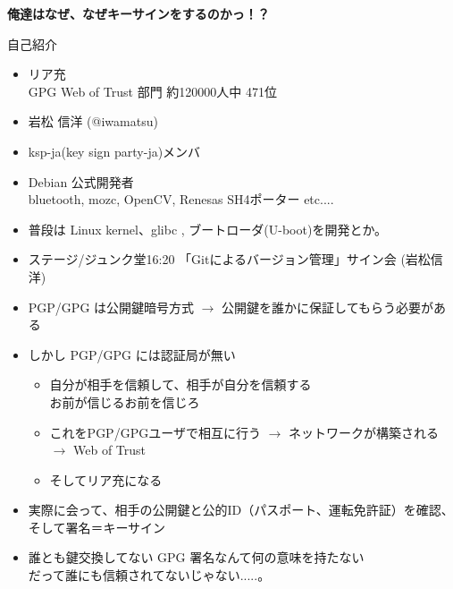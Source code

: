 \frame{\titlepage{}}

\begin{frame}
  \begin{center}\large\bfseries
   俺達はなぜ、なぜキーサインをするのかっ！？\\\pause
  \Huge  \color{red}{はやくリア充になりたいから...}
  \end{center}
\end{frame}

\begin{frame}{自己紹介}
\begin{itemize}[<+->]

\item リア充 \\
GPG Web of Trust 部門 約120000人中 471位
\item 岩松 信洋 (@iwamatsu)
\item ksp-ja(key sign party-ja)メンバ
\item Debian 公式開発者 \\
bluetooth, mozc, OpenCV, Renesas SH4ポーター etc....
\item 普段は Linux kernel、glibc , ブートローダ(U-boot)を開発とか。
\item ステージ/ジュンク堂16:20 「Gitによるバージョン管理」サイン会 (岩松信洋)
\end{itemize}
\end{frame}

\begin{frame}
  \begin{itemize}[<+->]
    \item PGP/GPG は公開鍵暗号方式 $\rightarrow$ 公開鍵を誰かに保証してもらう必要がある
    \item しかし PGP/GPG には認証局が無い
    \begin{itemize}
      \item 自分が相手を信頼して、相手が自分を信頼する\\
            お前が信じるお前を信じろ
      \item これをPGP/GPGユーザで相互に行う $\rightarrow$ ネットワークが構築される $\rightarrow$ Web of Trust
      \item そして{\color{red}リア充}になる
    \end{itemize}
    \item 実際に会って、相手の公開鍵と公的ID（パスポート、運転免許証）を確認、そして署名＝キーサイン
    \item 誰とも鍵交換してない GPG 署名なんて何の意味を持たない\\
          だって誰にも信頼されてないじゃない.....。
  \end{itemize}
\end{frame}


